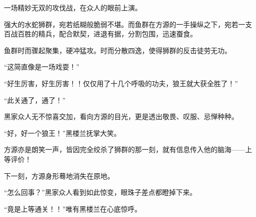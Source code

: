 \begin{this_body}
一场精妙无双的攻伐战，在众人的眼前上演。

强大的水蛇狮群，宛若纸糊般脆弱不堪。而鱼群在方源的一手操纵之下，宛若一支百战百胜的精兵，配合默契，进退有据，分割包围，迅速蚕食。

鱼群时而骤起聚集，硬冲猛攻。时而分散四逸，使得狮群的反击徒劳无功。

“这简直像是一场戏耍！”

“好生厉害，好生厉害！！仅仅用了十几个呼吸的功夫，狼王就大获全胜了！”

“此关通了，通了！”

黑家众人无不惊喜交加，看向方源的目光，更是透出敬畏、叹服、忌惮种种。

“好，好一个狼王！”黑楼兰抚掌大笑。

方源亦是朗笑一声，皆因完全绞杀了狮群的那一刻，就有信息传入他的脑海——上等评价！

下一刻，方源身形蓦地消失在原地。

“怎么回事？”黑家众人看到如此惊变，眼珠子差点都瞪掉下来。

“竟是上等通关！！”唯有黑楼兰在心底惊呼。

\end{this_body}

